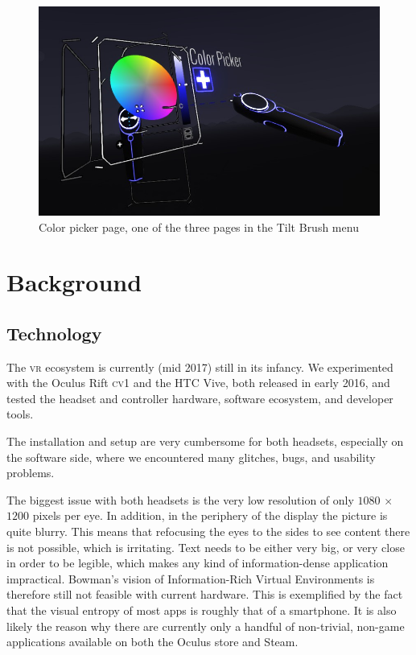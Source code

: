 \documentclass[nobib]{tufte-book} %
\begin{document}
\begin{figure}
  \includegraphics{tiltbrushmenu.png}
  \caption{Color picker page, one of the three pages in the Tilt Brush menu}
  \label{fig:tiltbrush}
\end{figure}



\chapter{Background}
\label{ch:background}

\section{Technology}
The \textsc{vr} ecosystem is currently (mid 2017) still in its infancy. We experimented with the Oculus Rift \textsc{cv1} and the \textsc{HTC} Vive, both released in early 2016, and tested the headset and controller hardware, software ecosystem, and developer tools.

The installation and setup are very cumbersome for both headsets, especially on the software side, where we encountered many glitches, bugs, and usability problems.

The biggest issue with both headsets is the very low resolution of only $1080$ $\times$ $1200$ pixels per eye. In addition, in the periphery of the display the picture is quite blurry. This means that refocusing the eyes to the sides to see content there is not possible, which is irritating. Text needs to be either very big, or very close in order to be legible, which makes any kind of information-dense application impractical. Bowman's vision of Information-Rich Virtual Environments \cite{bowman2003information} is therefore still not feasible with current hardware. This is exemplified by the fact that the visual entropy of most apps is roughly that of a smartphone. It is also likely the reason why there are currently only a handful of non-trivial, non-game applications available on both the Oculus store and Steam.
\end{document}
